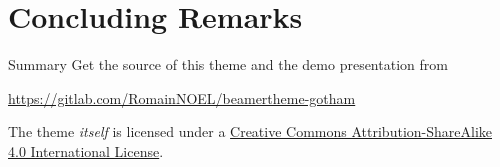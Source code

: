 \documentclass[aspectratio=169]{beamer}
\begin{document}
\section{Concluding Remarks}

	\begin{frame}{Summary}
		Get the source of this theme and the demo presentation from

		\begin{center}\url{https://gitlab.com/RomainNOEL/beamertheme-gotham}\end{center}

		The theme \emph{itself} is licensed under a \href{http://creativecommons.org/licenses/by-sa/4.0/}{Creative Commons Attribution-ShareAlike 4.0 International License}.
		\begin{center} \ccbysa \end{center}
	\end{frame}

% 
	
\end{document}
